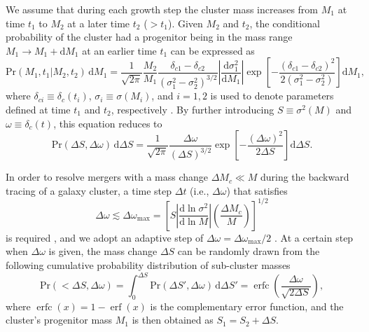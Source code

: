 \documentclass[modern]{aastex62}
\newcommand{\R}[1]{\mathrm{#1}}
\newcommand{\D}[1]{\R{d} #1}
\newcommand{\diff}[2]{\frac{\D{#1}}{\D{#2}}}
\DeclareMathOperator{\erf}{erf}
\DeclareMathOperator{\erfc}{erfc}
\begin{document}
We assume that during each growth step the cluster mass increases
from $M_1$ at time $t_1$ to $M_2$ at a later time $t_2$ ($> t_1$).
Given $M_2$ and $t_2$, the conditional probability of the cluster had
a progenitor being in the mass range $M_1 \to M_1 + \D{M_1}$ at an
earlier time $t_1$ can be expressed as
\begin{equation}
  \label{eq:eps-condprob}
  \R{Pr}(M_1, t_1 | M_2, t_2) \,\D{M_1} = \frac{1}{\sqrt{2\pi}}
  \frac{M_2}{M_1}
  \frac{\delta_{c1} - \delta_{c2}}{(\sigma_1^2 - \sigma_2^2)^{3/2}}
  \left| \diff{\sigma_1^2}{M_1} \right|
  \exp \!\left[ -\frac{(\delta_{c1} - \delta_{c2})^2}
    {2(\sigma_1^2 - \sigma_2^2)} \right] \D{M_1},
\end{equation}
where
$\delta_{ci} \equiv \delta_c(t_i)$, $\sigma_i \equiv \sigma(M_i)$, and $i =
1, 2$ is used to denote parameters defined at time $t_1$ and $t_2$,
respectively \citep{lacey1993,randall2002}.
By further introducing $S \equiv \sigma^2(M)$ and
$\omega \equiv \delta_c(t)$, this equation reduces to
\begin{equation}
  \label{eq:eps-condprob-simp}
  \R{Pr}(\Delta S, \Delta \omega) \,\D{\Delta S} = \frac{1}{\sqrt{2\pi}}
  \frac{\Delta\omega}{(\Delta S)^{3/2}}
  \exp \!\left[ -\frac{(\Delta\omega)^2}{2 \Delta S} \right] \D{\Delta S}.
\end{equation}

In order to resolve mergers with a mass change $\Delta M_c \ll M$
during the backward tracing of a galaxy cluster, a time step $\Delta t$
(i.e., $\Delta\omega$) that satisfies
\begin{equation}
  \label{sec:dw-step}
  \Delta\omega \lesssim \Delta\omega_{\R{max}} = \left[
    S \left| \diff{\ln \sigma^2}{\ln M} \right|
    \left( \frac{\Delta M_c}{M} \right) \right]^{1/2}
\end{equation}
is required \citep{lacey1993},
{\color{cyan}%
and we adopt an adaptive step of
$\Delta\omega = \Delta\omega_{\R{max}} / 2$ \citep{randall2002}.}
At a certain step when $\Delta\omega$ is given, the mass change
$\Delta S$ can be randomly drawn from the following cumulative
probability distribution of sub-cluster masses
\begin{equation}
  \label{sec:cdf-sub-masses}
  \R{Pr}(<\!\Delta S, \Delta\omega) =
  \int_0^{\Delta S} \R{Pr}(\Delta S', \Delta\omega) \,\D{\Delta S'} =
  \erfc \!\left( \frac{\Delta \omega}{\sqrt{2 \Delta S}} \right),
\end{equation}
where $\erfc(x) = 1 - \erf(x)$ is the complementary error function,
and the cluster's progenitor mass $M_1$ is then obtained as
$S_1 = S_2 + \Delta S$.
\end{document}
